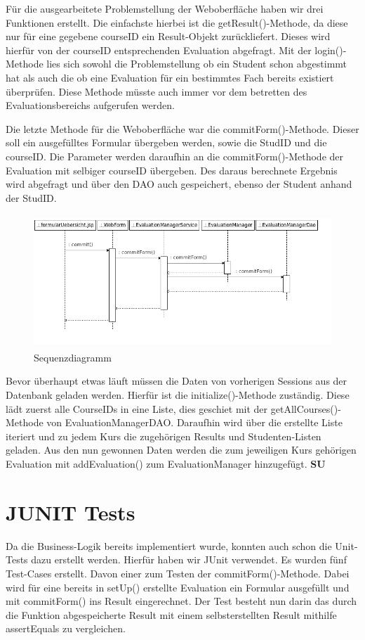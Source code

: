 \documentclass[titlepage, 12pt,a4paper]{scrartcl}
\begin{document}
Für die ausgearbeitete Problemstellung der Weboberfläche haben wir drei Funktionen erstellt.
Die einfachste hierbei ist die getResult()-Methode, da diese nur für eine gegebene courseID
ein Result-Objekt zurückliefert. Dieses wird hierfür von der courseID entsprechenden Evaluation
abgefragt.
Mit der login()-Methode lies sich sowohl die Problemstellung ob ein Student schon abgestimmt
hat als auch die ob eine Evaluation für ein bestimmtes Fach bereits existiert überprüfen. 
Diese Methode müsste auch immer vor dem betretten des Evaluationsbereichs aufgerufen werden.

Die letzte Methode für die Weboberfläche war die commitForm()-Methode. Dieser soll ein
ausgefülltes Formular übergeben werden, sowie die StudID und die courseID. Die Parameter
werden daraufhin an die commitForm()-Methode der Evaluation mit selbiger courseID übergeben.
Des daraus berechnete Ergebnis wird abgefragt und über den DAO auch gespeichert, ebenso der
Student anhand der StudID.

\begin{figure}[h]
\begin{center}
\includegraphics[width=15cm, height=5cm]{bilder/sequenceDiagram.png}
\caption{Sequenzdiagramm}
\label{sequenceDiagram}
\end{center}
\end{figure}

Bevor überhaupt etwas läuft müssen die Daten von vorherigen Sessions aus der Datenbank geladen werden.
Hierfür ist die initialize()-Methode zuständig. Diese lädt zuerst alle CourseIDs in eine Liste, 
dies geschiet mit der getAllCourses()-Methode von EvaluationManagerDAO. Daraufhin wird über die 
erstellte Liste iteriert und zu jedem Kurs die zugehörigen Results und Studenten-Listen geladen.
Aus den nun gewonnen Daten werden die zum jeweiligen Kurs gehörigen Evaluation mit addEvaluation()
zum EvaluationManager hinzugefügt.
{\bf{SU}}
\section{JUNIT Tests}
Da die Business-Logik bereits implementiert wurde, konnten auch schon die Unit-Tests
dazu erstellt werden. Hierfür haben wir JUnit verwendet. Es wurden fünf Test-Cases
erstellt. Davon einer zum Testen der commitForm()-Methode. Dabei wird für eine 
bereits in setUp() erstellte Evaluation ein Formular ausgefüllt und mit
commitForm() ins Result eingerechnet. Der Test besteht nun darin das durch
die Funktion abgespeicherte Result mit einem selbsterstellten Result mithilfe assertEquals zu vergleichen.
\end{document}

